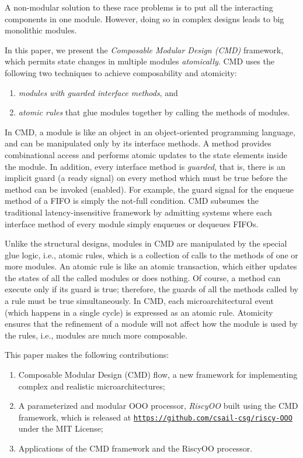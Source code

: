 \documentclass[conference]{IEEEtran}
\begin{document}
A non-modular solution to these race problems is to put all the interacting components in one module.
However, doing so in complex designs leads to big monolithic modules.

In this paper, we present the \emph{Composable Modular Design (CMD)} framework, which permits state changes in multiple modules \emph{atomically}.
CMD uses the following two techniques to achieve composability and atomicity:
\begin{enumerate}
    \item \emph{modules with guarded interface methods}, and
    \item \emph{atomic rules} that glue modules together by calling the methods of modules.
\end{enumerate}

In CMD, a module is like an object in an object-oriented programming language, and can be manipulated only by its interface methods.
A method provides combinational access and performs atomic updates to the state elements inside the module.
In addition, every interface method is \emph{guarded}, that is, there is an implicit guard (a ready signal) on every method which must be true before the method can be invoked (enabled).
For example, the guard signal for the enqueue method of a FIFO is simply the not-full condition.
CMD subsumes the traditional latency-insensitive framework by admitting systems where each interface method of every module simply enqueues or dequeues FIFOs.

Unlike the structural designs, modules in CMD are manipulated by the special glue logic, i.e., atomic rules, which is a collection of calls to the methods of one or more modules.
An atomic rule is like an atomic transaction, which either updates the states of all the called modules  or does nothing.
Of course, a method can execute only if its guard is true; therefore, the guards of all the methods called by a rule must be true simultaneously.
In CMD, each microarchitectural event (which happens in a single cycle) is expressed as an atomic rule.
Atomicity ensures that the refinement of a module will not affect how the module is used by the rules, i.e., modules are much more composable.

This paper makes the following contributions:
\begin{enumerate}
    \item Composable Modular Design (CMD) flow, a new framework for implementing complex and realistic microarchitectures;
    
    \item A parameterized and modular OOO processor, \emph{RiscyOO} built using the CMD framework, which is released at \texttt{\url{https://github.com/csail-csg/riscy-OOO}} under the MIT License;
    
    \item Applications of the CMD framework and the RiscyOO processor.
\end{enumerate}
\end{document}
